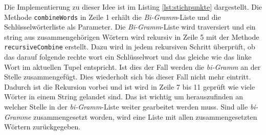 Die Implementierung zu dieser Idee ist im Listing \ref{lst:stichpunkte} dargestellt. Die Methode \lstinline{combineWords} in Zeile 1 erhält die \emph{Bi-Gramm}-Liste und die Schlüsselwörterliste als Parameter. Die \emph{Bi-Gramm}-Liste wird traversiert und ein string aus zusammengehörigen Wörtern wird rekursiv in Zeile 5 mit der Methode \lstinline{recursiveCombine} erstellt. Dazu wird in jedem rekursiven Schritt überprüft, ob das darauf folgende rechte wort ein Schlüsselwort und das gleiche wie das linke Wort im aktuellen Tupel entspricht. Ist dies der Fall werden die \emph{bi-Gramm} an der Stelle zusammengefügt. Dies wiederholt sich bis dieser Fall nicht mehr eintritt. Dadurch ist die Rekursion vorbei und ist wird in Zeile 7 bis 11 geprüft wie viele Wörter in einem String gelandet sind. Das ist wichtig um herauszufinden an welcher Stelle in der \emph{bi-Gramm}-Liste weiter gearbeitet werden muss. Sind alle \emph{bi-Gramme} zusammengesetzt worden, wird eine Liste mit allen zusammengesetzten Wörtern zurückgegeben.
